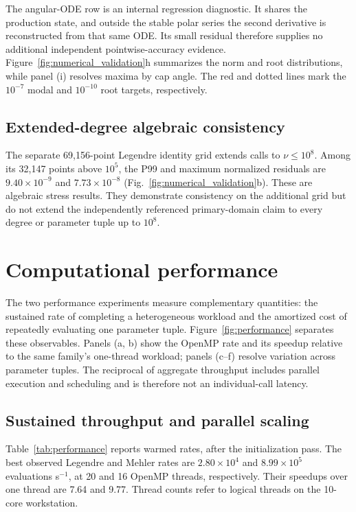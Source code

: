 ﻿\documentclass[11pt,a4paper]{article}
\begin{document}
The angular-ODE row is an internal regression diagnostic. It shares the production state, and outside the stable polar series the second derivative is reconstructed from that same ODE. Its small residual therefore supplies no additional independent pointwise-accuracy evidence. Figure~\ref{fig:numerical_validation}h summarizes the norm and root distributions, while panel (i) resolves maxima by cap angle. The red and dotted lines mark the $10^{-7}$ modal and $10^{-10}$ root targets, respectively.

\subsection{Extended-degree algebraic consistency}

The separate 69,156-point Legendre identity grid extends calls to $\nu\leq10^8$. Among its 32,147 points above $10^5$, the P99 and maximum normalized residuals are $9.40\times10^{-9}$ and $7.73\times10^{-8}$ (Fig.~\ref{fig:numerical_validation}b). These are algebraic stress results. They demonstrate consistency on the additional grid but do not extend the independently referenced primary-domain claim to every degree or parameter tuple up to $10^8$.



\section{Computational performance}
\label{sec:performance}

The two performance experiments measure complementary quantities: the sustained rate of completing a heterogeneous workload and the amortized cost of repeatedly evaluating one parameter tuple. Figure~\ref{fig:performance} separates these observables. Panels (a, b) show the OpenMP rate and its speedup relative to the same family's one-thread workload; panels (c--f) resolve variation across parameter tuples. The reciprocal of aggregate throughput includes parallel execution and scheduling and is therefore not an individual-call latency.

\subsection{Sustained throughput and parallel scaling}

Table~\ref{tab:performance} reports warmed rates, after the initialization pass. The best observed Legendre and Mehler rates are $2.80\times10^{4}$ and $8.99\times10^{5}$ evaluations s$^{-1}$, at 20 and 16 OpenMP threads, respectively. Their speedups over one thread are 7.64 and 9.77. Thread counts refer to logical threads on the 10-core workstation.
\end{document}
